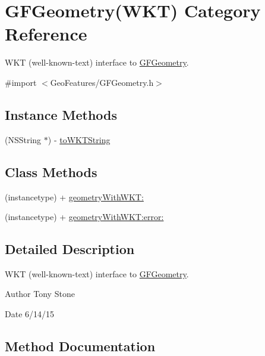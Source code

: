 \hypertarget{category_g_f_geometry_07_w_k_t_08}{}\section{G\+F\+Geometry(W\+K\+T) Category Reference}
\label{category_g_f_geometry_07_w_k_t_08}


W\+K\+T (well-\/known-\/text) interface to \hyperlink{interface_g_f_geometry}{G\+F\+Geometry}.  




{\ttfamily \#import $<$Geo\+Features/\+G\+F\+Geometry.\+h$>$}

\subsection*{Instance Methods}
\begin{DoxyCompactItemize}
\item 
(N\+S\+String $\ast$) -\/ \hyperlink{category_g_f_geometry_07_w_k_t_08_a9d257cce05d031211e2cece24b5530e4}{to\+W\+K\+T\+String}
\end{DoxyCompactItemize}
\subsection*{Class Methods}
\begin{DoxyCompactItemize}
\item 
(instancetype) + \hyperlink{category_g_f_geometry_07_w_k_t_08_a32a49e08fdbc2998735c26ddbfa88741}{geometry\+With\+W\+K\+T\+:}
\item 
(instancetype) + \hyperlink{category_g_f_geometry_07_w_k_t_08_a9517f77b573e92c5f1f76ce63ec53a89}{geometry\+With\+W\+K\+T\+:error\+:}
\end{DoxyCompactItemize}


\subsection{Detailed Description}
W\+K\+T (well-\/known-\/text) interface to \hyperlink{interface_g_f_geometry}{G\+F\+Geometry}. 

\begin{DoxyAuthor}{Author}
Tony Stone 
\end{DoxyAuthor}
\begin{DoxyDate}{Date}
6/14/15 
\end{DoxyDate}


\subsection{Method Documentation}
\hypertarget{category_g_f_geometry_07_w_k_t_08_a32a49e08fdbc2998735c26ddbfa88741}{}
